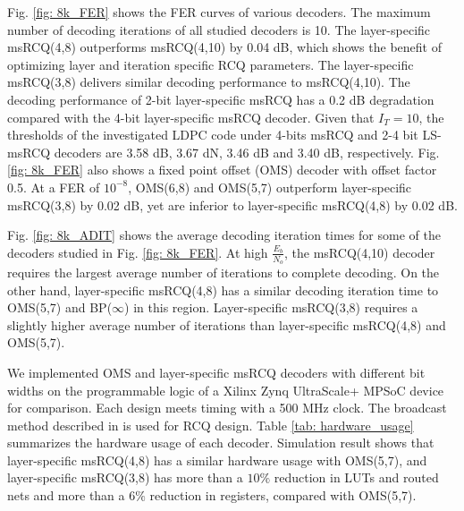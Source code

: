 \documentclass [PhD] {uclathes}
\begin{document}
Fig. \ref{fig: 8k_FER} shows the FER curves of various decoders. The maximum number of decoding iterations of all studied decoders is 10. The layer-specific msRCQ(4,8) outperforms msRCQ(4,10) by 0.04 dB, which shows the benefit of optimizing layer and iteration specific RCQ parameters.  
The layer-specific msRCQ(3,8) delivers similar decoding performance to msRCQ(4,10). The decoding performance of 2-bit layer-specific msRCQ has a 0.2 dB degradation compared with the 4-bit  layer-specific msRCQ decoder. 
Given that  $I_T=10$, the thresholds of the investigated LDPC code under 4-bits msRCQ and 2-4 bit LS-msRCQ decoders  are 3.58 dB, 3.67 dN,  3.46 dB  and 3.40 dB, respectively. 
Fig. \ref{fig: 8k_FER} also shows a fixed point offset \minsum (OMS) decoder with offset factor 0.5. At a FER of $10^{-8}$, OMS(6,8) and OMS(5,7) outperform layer-specific msRCQ(3,8) by 0.02 dB, yet are inferior to layer-specific msRCQ(4,8) by 0.02 dB.  

Fig. \ref{fig: 8k_ADIT} shows the average decoding iteration times for some of the decoders studied in Fig. \ref{fig: 8k_FER}. At high $\frac{E_b}{N_o}$, the msRCQ(4,10) decoder requires the largest average number of iterations to complete decoding. On the other hand, layer-specific msRCQ(4,8) has a similar decoding iteration time to OMS(5,7) and BP($\infty$) in this region. Layer-specific msRCQ(3,8) requires a slightly higher average number of iterations than layer-specific msRCQ(4,8) and OMS(5,7). 

We implemented OMS and layer-specific msRCQ decoders with different bit widths on the programmable logic of a Xilinx Zynq UltraScale+ MPSoC device for comparison. Each design meets timing with a 500 MHz clock. The broadcast method described in \cite{Terrill2021-ec} is used for RCQ design. 
Table \ref{tab: hardware_usage} summarizes the hardware usage of each decoder. 
Simulation result shows that layer-specific msRCQ(4,8) has a similar hardware usage with OMS(5,7), and layer-specific msRCQ(3,8) has more than a $10\%$ reduction in LUTs and routed nets and more than a $6\%$ reduction in registers, compared with OMS(5,7).
\end{document}
